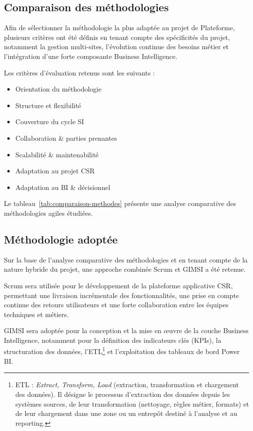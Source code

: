 \subsection{Comparaison des méthodologies}

Afin de sélectionner la méthodologie la plus adaptée au projet de Plateforme, plusieurs critères ont été définis en tenant compte des spécificités du projet, notamment la gestion multi-sites, l’évolution continue des besoins métier et l’intégration d’une forte composante Business Intelligence.

Les critères d’évaluation retenus sont les suivants :

\begin{itemize}[label=\textbullet, itemsep=0.15ex, parsep=0pt, topsep=0pt, partopsep=0pt]
  \item Orientation du méthodologie
  \item Structure et flexibilité
  \item Couverture du cycle SI
  \item Collaboration \& parties prenantes
  \item Scalabilité \& maintenabilité
  \item Adaptation au projet CSR
  \item Adaptation au BI \& décisionnel
\end{itemize}


%
Le tableau~\ref{tab:comparaison-methodes} présente une analyse comparative des méthodologies agiles étudiées.




\subsection{Méthodologie adoptée}

Sur la base de l’analyse comparative des méthodologies et en tenant compte de la nature hybride du projet, une approche combinée Scrum et GIMSI a été retenue.

Scrum sera utilisée pour le développement de la plateforme applicative CSR, permettant une livraison incrémentale des fonctionnalités, une prise en compte continue des retours utilisateurs et une forte collaboration entre les équipes techniques et métiers.

GIMSI sera adoptée pour la conception et la mise en œuvre de la couche Business Intelligence, notamment pour la définition des indicateurs clés (KPIs), la structuration des données, l’ETL\footnote{ETL : \emph{Extract, Transform, Load} (extraction, transformation et chargement des données). Il désigne le processus d’extraction des données depuis les systèmes sources, de leur transformation (nettoyage, règles métier, formats) et de leur chargement dans une zone ou un entrepôt destiné à l’analyse et au reporting.} et l’exploitation des tableaux de bord Power BI.

